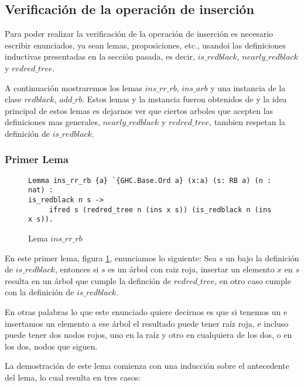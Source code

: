 \subsection{Verificación de la operación de inserción}

Para poder realizar la verificaci\'on de la operaci\'on de inserci\'on es necesario escribir
enunciados, ya sean lemas, proposiciones, etc., usandoi las definiciones inductivas presentadas en
la secci\'on pasada, es decir, $is\_redblack$, $nearly\_redblack$ y $redred\_tree$.

A continuaci\'on mostraremos los lemas $ins\_rr\_rb$, $ins\_arb$ y una instancia \cite{classes}
de la clase $redblack$, $add\_rb$. Estos lemas y la instancia fueron obtenidos de \cite{MSetRBT} y
la idea principal de estos lemas es dejarnos ver que ciertos arboles que acepten las definiciones
mas generales, $nearly\_redblack$ y $redred\_tree$, tambien respetan la definici\'on de
$is\_redblack$.

\subsubsection{Primer Lema}

\begin{figure}
\centering
\captionsetup{justification=centering}
\begin{verbatim}
Lemma ins_rr_rb {a} `{GHC.Base.Ord a} (x:a) (s: RB a) (n : nat) :
is_redblack n s ->
     ifred s (redred_tree n (ins x s)) (is_redblack n (ins x s)).
\end{verbatim}
\caption{Lema $ins\_rr\_rb$}
\label{lema_1}
\end{figure}

En este primer lema, figura \ref{lema_1}, enunciamos lo siguiente: Sea $s$ un {\arn} bajo la
definici\'on de $is\_redblack$, entonces si $s$ es un \'arbol con raiz roja, insertar un elemento
$x$ en $s$ resulta en un \'arbol que cumple la definci\'on de $redred\_tree$, en otro caso cumple
con la definici\'on de $is\_redblack$.

En otras palabras lo que este enunciado quiere decirnos es que si tenemos un {\arn} e insertamos
un elemento a ese \'arbol el resultado puede tener ra\'iz roja, e incluso puede tener dos nodos
rojos, uno en la ra\'iz y otro en cualquiera de los dos, o en los dos, nodos que siguen.

La demostraci\'on de este lema comienza con una inducci\'on sobre el antecedente del lema, lo cual
resulta en tres casos:

